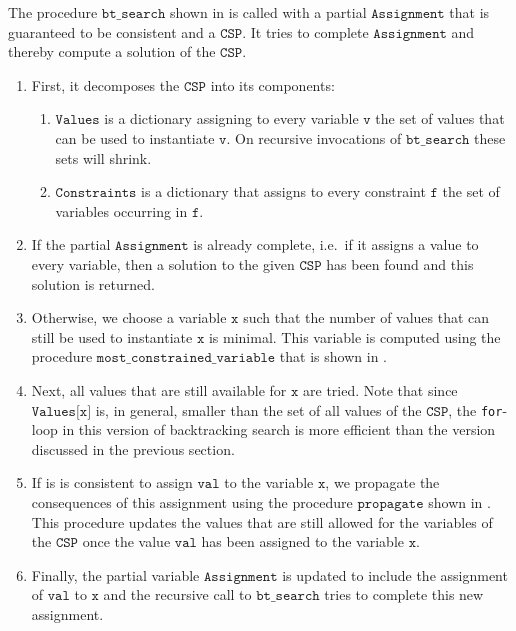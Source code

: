 The procedure $\texttt{bt\_search}$ shown in  is called with a
partial $\texttt{Assignment}$ that is guaranteed to be 
consistent and a $\texttt{CSP}$.  It tries to complete $\texttt{Assignment}$ and thereby compute a solution of the $\texttt{CSP}$.
\begin{enumerate}
\item First, it decomposes the $\texttt{CSP}$ into its components:
      \begin{enumerate}
      \item $\texttt{Values}$ is a dictionary assigning to every variable $\texttt{v}$ the set of values 
            that can be used to instantiate $\texttt{v}$.  On recursive invocations of $\texttt{bt\_search}$
            these sets will shrink.
      \item $\texttt{Constraints}$ is a dictionary that assigns to every constraint $\texttt{f}$ the set of
            variables occurring in $\texttt{f}$.
      \end{enumerate}
\item If the partial $\texttt{Assignment}$ is already complete, i.e.~if it assigns a value to every variable, 
      then a solution to the given $\texttt{CSP}$ has been found and this solution is returned.
\item Otherwise, we choose a variable $\texttt{x}$ such that the number of values that can still be used to
      instantiate $\texttt{x}$ is minimal.  This variable is computed using the procedure
      $\texttt{most\_constrained\_variable}$ that is shown in .
\item Next, all values that are still available for $\texttt{x}$ are tried.  Note that since
      $\texttt{Values[x]}$ is, in general, smaller than the set of all values of the $\texttt{CSP}$,
      the \texttt{for}-loop in this version of backtracking search is more efficient than the version discussed
      in the previous section. 
\item If is is consistent to assign $\texttt{val}$ to the variable $\texttt{x}$, we propagate the consequences
      of this assignment using the procedure $\texttt{propagate}$ shown in
      .
      This procedure updates the values that are still allowed for the variables of the $\texttt{CSP}$ once the
      value $\texttt{val}$ has been assigned to the variable $\texttt{x}$.
\item Finally, the partial variable $\texttt{Assignment}$ is updated to include the assignment of 
      $\texttt{val}$ to $\texttt{x}$ and the recursive call to $\texttt{bt\_search}$ tries to complete this new
      assignment. 
\end{enumerate}

